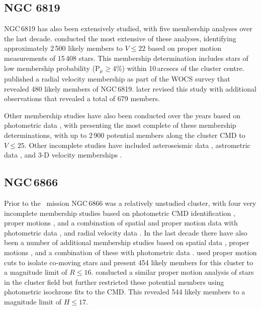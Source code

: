 \subsection{NGC 6819}

NGC\,6819 has also been extensively studied, with five membership analyses over the last decade. \cite{platais_wiyn_2013} conducted the most extensive of these analyses, identifying approximately 2\,500 likely members to $V\leq22$ based on proper motion measurements of 15\,408 stars. This membership determination includes stars of low membership probability (P$_\mu \geq 4\%$) within 10\,arcsecs of the cluster centre. \cite{hole_wiyn_2009} published a radial velocity membership as part of the WOCS survey \citep{mathieu_wiyn_2000} that revealed 480 likely members of NGC\,6819. \cite{milliman_wiyn_2014} later revised this study with additional observations that revealed a total of 679 members.

Other membership studies have also been conducted over the years based on photometric data \citep{burkhead_photometric_1970,lindoff_old_1972,auner_photographic_1974, rosvick_bv_1998, yang_wiyn_2013}, with \cite{kalirai_cfht_2001} presenting the most complete of these membership determinations, with up to 2\,900 potential members along the cluster CMD to $V\leq25$. Other incomplete studies have included asteroseismic data \citep{stello_asteroseismic_2011, bellamy_using_2015}, astrometric data \citep{sanders_membership_1972}, and 3-D velocity memberships \citep{gao_3d_2015}.

\subsection{NGC\,6866}

Prior to the \Kepler~mission NGC\,6866 was a relatively unstudied cluster, with four very incomplete membership studies based on photometric CMD identification \cite[binary membership only;][]{loktin_proper_2003}, proper motions \citep{dias_proper_2002}, and a combination of spatial and proper motion data with photometric data \citep{kharchenko_109_2005}, and radial velocity data \citep{frinchaboy_open_2008}. 
In the last decade there have also been a number of additional membership studies based on spatial data \citep{janes_open_2014}, proper motions \citep{molenda-zakowicz_spectroscopic_2009}, and a combination of these with photometric data \citep{joshi_photometric_2012}. \cite{dias_proper_2014} used proper motion cuts to isolate co-moving stars and present 454 likely members for this cluster to a magnitude limit of $R\leq16$. \cite{joshi_identification_2016} conducted a similar proper motion analysis of stars in the cluster field but further restricted these potential members using photometric isochrone fits to the CMD. This revealed 544 likely members to a magnitude limit of $H\leq17$.

